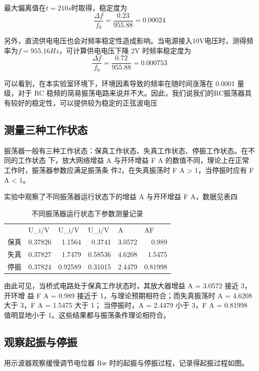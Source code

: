 \documentclass[a4paper,11pt,UTF8]{ctexart}
\begin{document}
最大偏离值在$t = 210s$时取得，稳定度为
\[\frac{\Delta f}{f_0} = \frac{0.23}{955.88} = 0.00024\]


另外，直流供电电压也会对频率稳定性造成影响。当电源接入10V电压时，测得频率为$f = 955.16Hz$，可计算供电电压下降 2V 时频率稳定度为
\[\frac{\Delta f}{f_0} = \frac{0.72}{955.88} = 0.000753\]

可以看到，在本实验室环境下，环境因素导致的频率在随时间涨落在 0.0001 量级，对于
RC 稳频的简易振荡电路来说并不大。因此，我们说我们的RC振荡器具有较好的稳定性，可以提供较为稳定的正弦波电压

\subsection{测量三种工作状态}
振荡器一般有三种工作状态：保真工作状态、失真工作状态、停振工作状态。在不同的工作状态
下，放大网络增益 A 与开环增益 F A 的数值不同，理论上在正常工作时，振荡器参数应满足振荡条
件2，在失真振荡时 F A > 1，当停振时应有 F A < 1。


实验中观察了不同振荡器运行状态下的增益 A 与开环增益 F A，数据见表四

\begin{table}[htbp]
	\centering
	\caption{不同振荡器运行状态下参数测量记录}
	\begin{tabular}{lrrrrr}
		& \multicolumn{1}{l}{U\_i/V} & \multicolumn{1}{l}{U\_i/V} & \multicolumn{1}{l}{U\_i/V} & \multicolumn{1}{l}{A} & \multicolumn{1}{l}{AF} \\
		保真    & 0.37826 & 1.1564 & 0.3741 & 3.0572 & 0.989 \\
		失真    & 0.37827 & 1.7479 & 0.58536 & 4.6208 & 1.5475 \\
		停振    & 0.37824 & 0.92589 & 0.31015 & 2.4479 & 0.81998 \\
	\end{tabular}%
	\label{tab:addlabel}%
\end{table}%

由此可见，当桥式电路处于保真工作状态时，其放大器增益 A = 3.0572 接近 3，开环增
益 F A = 0.989 接近于 1，与理论预期相符合；而失真振荡时 A = 4.6208 大于 3，F A = 1.5475 大于 1；
当停振时，A = 2.4479 小于 3，F A = 0.81998 值明显地小于 1。这些结果都与振荡条件理论相符合。


\subsection{观察起振与停振}
用示波器观察缓慢调节电位器 Rw 时的起振与停振过程，记录得起振过程如图。
\end{document}
